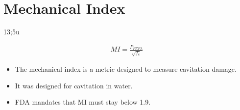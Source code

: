 \section*{Mechanical Index}
13;5u

\begin{align*}
  MI = \frac{P_{PRPA}}{\sqrt{f_c}}
\end{align*}

\begin{itemize}
\item The mechanical index is a metric designed to measure cavitation
  damage.
\item It was designed for cavitation in water.
\item FDA mandates that MI must stay below 1.9.
\end{itemize}


